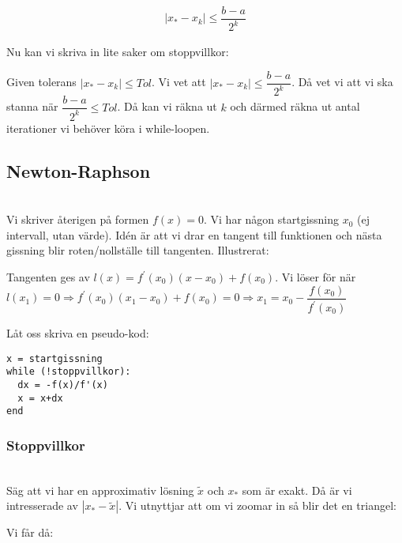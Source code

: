 \begin{equation*}
  \begin{gathered}
    \left|x_*-x_k\right|\leq \dfrac{b-a}{2^k}
  \end{gathered}
\end{equation*}
\par\bigskip
\noindent Nu kan vi skriva in lite saker om stoppvillkor:
\par\bigskip
\noindent Given tolerans $\left|x_*-x_k\right|\leq Tol$. Vi vet att $\left|x_*-x_k\right|\leq\dfrac{b-a}{2^k}$. Då vet vi att vi ska stanna när $\dfrac{b-a}{2^k}\leq Tol$. Då kan vi räkna ut $k$ och därmed räkna ut antal iterationer vi behöver köra i while-loopen.
\par\bigskip

\subsection{Newton-Raphson}\hfill\\

\noindent Vi skriver återigen på formen $f(x) = 0$. Vi har någon startgissning $x_0$ (ej intervall, utan värde). Idén är att vi drar en tangent till funktionen och nästa gissning blir roten/nollställe till tangenten. Illustrerat:

\begin{center}
\end{center}
\par\bigskip
\noindent Tangenten ges av $l(x) = f^{\prime}(x_0)(x-x_0)+f(x_0)$. Vi löser för när $l(x_1)=0\Rightarrow f^{\prime}(x_0)(x_1-x_0)+f(x_0)=0\Rightarrow x_1 = x_0-\dfrac{f(x_0)}{f^{\prime}(x_0)}$
\par\bigskip
\noindent Låt oss skriva en pseudo-kod:

\begin{verbatim}
x = startgissning
while (!stoppvillkor):
  dx = -f(x)/f'(x)
  x = x+dx
end
\end{verbatim}
\par\bigskip
\subsubsection{Stoppvillkor}\hfill\\
\noindent Säg att vi har en approximativ lösning $\tilde{x}$ och $x_*$ som är exakt. Då är vi intresserade av $|x_*-\tilde{x}|$. Vi utnyttjar att om vi zoomar in så blir det en triangel:

\begin{center}
\end{center}
\par\bigskip
\noindent Vi får då:


